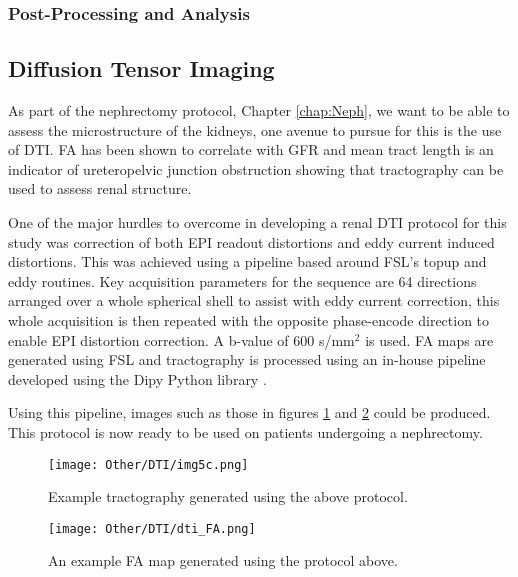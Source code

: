 \subsubsection{Post-Processing and Analysis}

\subsection{Diffusion Tensor Imaging}

As part of the nephrectomy protocol, Chapter \ref{chap:Neph}, we want to be able to assess the microstructure of the kidneys, one avenue to pursue for this is the use of \ac{DTI}. \ac{FA} has been shown to correlate with \ac{GFR} \cite{liu_chronic_2015} and mean tract length is an indicator of ureteropelvic junction obstruction \cite{delgado_pilot_2019} showing that tractography can be used to assess renal structure.

One of the major hurdles to overcome in developing a renal \ac{DTI} protocol for this study was correction of both \ac{EPI} readout distortions and eddy current induced distortions. This was achieved using a pipeline based around \ac{FSL}'s topup \cite{andersson_how_2003, smith_advances_2004} and eddy \cite{andersson_integrated_2016} routines. Key acquisition parameters for the sequence are 64 directions arranged over a whole spherical shell to assist with eddy current correction, this whole acquisition is then repeated with the opposite phase-encode direction to enable \ac{EPI} distortion correction. A b-value of 600 s/mm$^2$ is used. \ac{FA} maps are generated using \ac{FSL} and tractography is processed using an in-house pipeline developed using the Dipy Python library \cite{garyfallidis_dipy_2014}.

Using this pipeline, images such as those in figures \ref{fig:dti_tracts} and \ref{fig:dti_fa} could be produced. This protocol is now ready to be used on patients undergoing a nephrectomy.

\begin{figure}[H]
	\centering
	\texttt{[image: Other/DTI/img5c.png]}
	\caption{Example tractography generated using the above protocol.}
	\label{fig:dti_tracts}
\end{figure}

\begin{figure}[H]
	\centering
	\texttt{[image: Other/DTI/dti\_FA.png]}
	\caption{An example \ac{FA} map generated using the protocol above.}
	\label{fig:dti_fa}
\end{figure}
